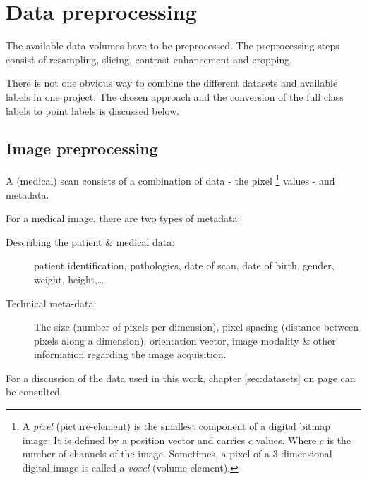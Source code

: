 \chapter{Data preprocessing}\thispagestyle{empty}

The available data volumes have to be preprocessed.
The preprocessing steps consist of resampling, slicing, contrast enhancement and cropping.  

There is not one obvious way to combine the different datasets and available labels in one project.
The chosen approach and the conversion of the full class labels to point labels is discussed below.

\section{Image preprocessing}

\par{
A (medical) scan consists of a combination of data - the pixel
\footnote{A \textit{pixel} (picture-element) is the smallest component of a digital bitmap image. 
It is defined by a position vector and carries $c$ values. Where $c$ is the number of channels of the image. 
Sometimes, a pixel of a 3-dimensional digital image is called a \textit{voxel} (volume element).} 
values - and metadata.
}


For a medical image, there are two types of metadata:
\begin{description}
    \item [Describing the patient \& medical data:] patient identification, pathologies, date of scan, date of birth, gender, weight, height,\dots
    \item [Technical meta-data:] The size (number of pixels per dimension), pixel spacing (distance between pixels along a dimension), orientation vector, image modality \& other information regarding the image acquisition.
\end{description}

For a discussion of the data used in this work, chapter \ref{sec:datasets} on page \pageref{sec:datasets} can be consulted. 

